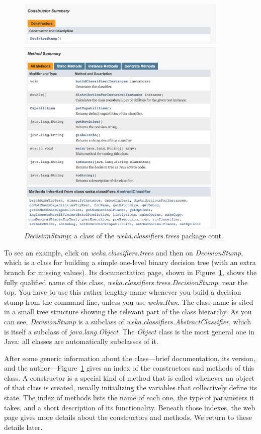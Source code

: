 \begin{figure}[!thp]
\ContinuedFloat
\centering
\includegraphics[width=0.9\textwidth]{images/B5_2b.png}
\caption{\textit{DecisionStump}: a class of the \textit{weka.classifiers.trees} package cont.}
\label{fig:javadoc_decisionstump}
\end{figure}

To see an example, click on \textit{weka.classifiers.trees} and then on
\textit{DecisionStump}, which is a class for building a simple one-level binary
decision tree (with an extra branch for missing values). Its
documentation page, shown in Figure~\ref{fig:javadoc_decisionstump},
shows the fully qualified name of this class,
\textit{weka.classifiers.trees.DecisionStump}, near the top. You have to use
this rather lengthy name whenever you build a decision stump from the
command line, unless you use {\em weka.Run}. The class name is sited in a small tree structure
showing the relevant part of the class hierarchy. As you can see,
\textit{DecisionStump} is a subclass of \textit{weka.classifiers.AbstractClassifier},
which is itself a subclass
of \textit{java.lang.Object}. The \textit{Object} class is the most
general one in Java: all classes are automatically subclasses of it.

After some generic information about the class---brief documentation,
its version, and the author---Figure~\ref{fig:javadoc_decisionstump}
gives an index of the constructors and methods of this class. A
constructor is a special kind of method that is called whenever an
object of that class is created, usually initializing the variables
that collectively define its state. The index of methods lists the
name of each one, the type of parameters it takes, and a short
description of its functionality. Beneath those indexes, the web page
gives more details about the constructors and methods. We return to
these details later.

